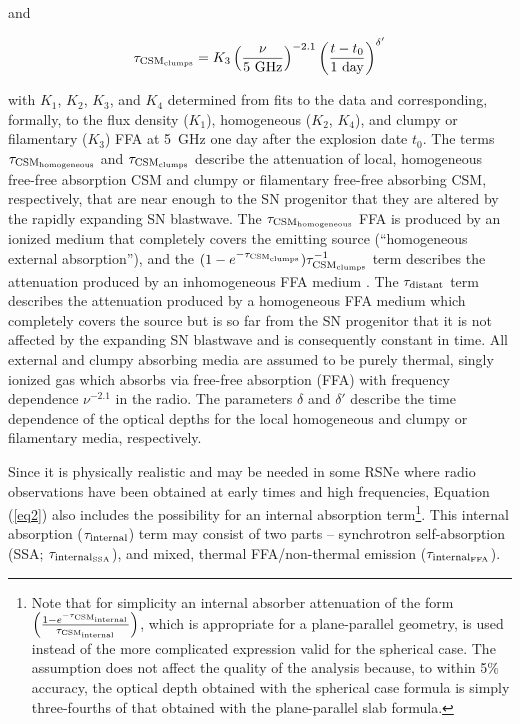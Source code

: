 \documentclass[12pt,preprint]{aastex}
\begin{document}
\noindent and

\begin{equation}
\label{eq6}
\tau_{{\rm CSM}_{\rm clumps}}  =  K_3 \left(\frac{\nu}{\mbox{5\
GHz}}\right)^{-2.1} \left(\frac{t-t_0}{\mbox{1\
day}}\right)^{\delta^{\prime}}
\end{equation} 

\noindent with $K_1$, $K_2$, $K_3$, and $K_4$ determined from fits to the data and corresponding, formally, to the flux density ($K_1$), homogeneous ($K_2$, $K_4$), and clumpy or filamentary ($K_3$) FFA 
at 5~GHz one day after the explosion date $t_0$.  The terms $\tau_{{\rm CSM}_{\rm homogeneous}}$ and  $\tau_{{\rm CSM}_{\rm clumps}}$ describe the attenuation of local, homogeneous free-free absorption CSM and clumpy or filamentary free-free absorbing CSM, respectively, that are near enough to the SN progenitor that they are altered by the rapidly expanding SN blastwave.  The $\tau_{{\rm CSM}_{\rm homogeneous}}$ FFA is produced by an ionized medium that completely covers the emitting source (``homogeneous external absorption''), and the $(1-e^{-\tau_{{\rm CSM}_{\rm clumps}}}) \tau_{{\rm CSM}_{\rm clumps}}^{-1}$ term describes the attenuation produced by an inhomogeneous FFA medium \citep[``clumpy absorption''; see][for a more detailed discussion of attenuation in inhomogeneous media]{Natta84}. The $\tau_{\rm distant}$ term describes the attenuation produced by a homogeneous FFA medium which completely covers the source but is so far from the SN progenitor that it is not affected by the expanding SN blastwave and is consequently constant in time.  All external and clumpy absorbing media are assumed to be purely thermal, singly ionized gas which absorbs via free-free absorption (FFA) with frequency dependence $\nu^{-2.1}$ in the radio.  The parameters $\delta$
and $\delta'$ describe the time dependence of the optical depths for the local homogeneous and clumpy or filamentary media, respectively. 

Since it is physically realistic and may be needed in some RSNe where radio observations have been obtained at early times and high frequencies, Equation (\ref{eq2}) also includes the possibility for an internal absorption term\footnote{Note that for simplicity an internal absorber attenuation of the form $\left(\frac{1-e^{-\tau_{{\rm CSM}_{\rm internal}}}}{\tau_{{\rm CSM}_{\rm internal}}}\right)$, which is appropriate for a plane-parallel geometry, is used instead of the more complicated expression \citep[e.g., ][]{Osterbrock74} valid for the spherical case.  The assumption does not affect the quality of the analysis because, to within 5\% accuracy, the optical depth obtained with the spherical case formula is simply three-fourths of that obtained with the plane-parallel slab formula.}.  This internal absorption  ($\tau_{\rm internal}$) term may consist of two parts -- synchrotron self-absorption (SSA; $\tau_{{\rm internal}_{\rm SSA}}$), and mixed, thermal FFA/non-thermal emission ($\tau_{{\rm internal}_{\rm FFA}}$). 
\end{document}

